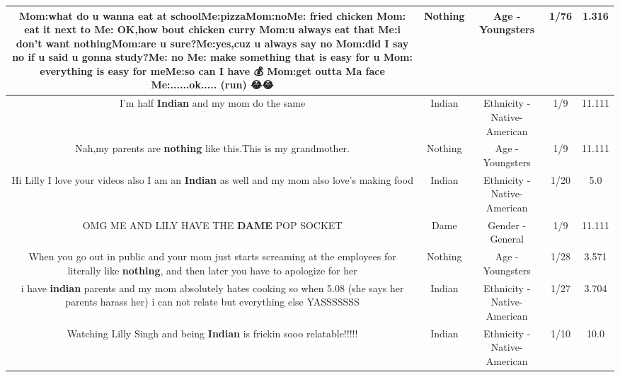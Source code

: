 \documentclass[11pt]{article}
\newlength\mylength
\begin{document}
\begin{center}
\begin{longtable}{|C{.65\mylength}|C{.30\mylength}|C{.12\mylength}|C{.12\mylength}|C{.12\mylength}|}
  \small Mom:what do u wanna eat at schoolMe:pizzaMom:noMe: fried chicken Mom: eat it next to Me: OK,how bout chicken curry Mom:u always eat that Me:i don't want \textbf{nothing}Mom:are u sure?Me:yes,cuz u always say no Mom:did I say no if u said u gonna study?Me: no Me: make something that is easy for u Mom: everything is easy for meMe:so can I have 💰 Mom:get outta Ma face Me:......ok..... (run) 😂😂\normalsize   & Nothing & Age - Youngsters & 1/76 & 1.316 \\  \hline
  \small I'm half \textbf{Indian} and my mom do the   same\normalsize   & Indian & Ethnicity - Native-American & 1/9 & 11.111 \\  \hline
  \small Nah,my parents are \textbf{nothing} like this.This is my grandmother.\normalsize   & Nothing & Age - Youngsters & 1/9 & 11.111 \\  \hline
  \small Hi Lilly I love your videos also I am an \textbf{Indian} as well and my mom also love's making food\normalsize   & Indian & Ethnicity - Native-American & 1/20 & 5.0 \\  \hline
  \small OMG ME AND LILY HAVE THE \textbf{DAME} POP SOCKET\normalsize   & Dame & Gender - General & 1/9 & 11.111 \\  \hline
  \small When you go out in public and your mom just starts screaming at the employees for literally like \textbf{nothing}, and then later you have to apologize for her\normalsize   & Nothing & Age - Youngsters & 1/28 & 3.571 \\  \hline
  \small i have \textbf{indian} parents and my mom absolutely hates cooking so when 5.08 (she says her parents harass her) i can not relate but everything else YASSSSSSS\normalsize   & Indian & Ethnicity - Native-American & 1/27 & 3.704 \\  \hline
  \small Watching Lilly Singh and being \textbf{Indian} is frickin sooo relatable!!!!!\normalsize   & Indian & Ethnicity - Native-American & 1/10 & 10.0 \\  \hline

\end{longtable}
\end{center}
\end{document}
